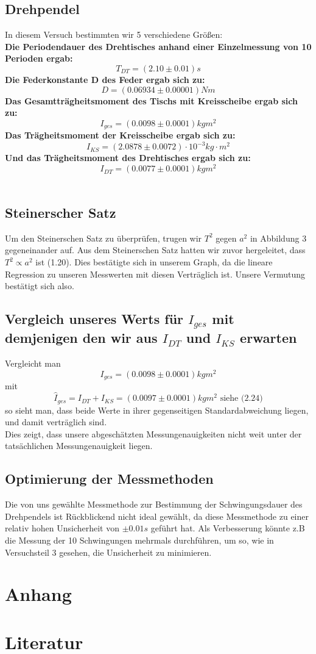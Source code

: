 \documentclass[11pt,a4paper]{article}
\begin{document}
	\subsection{Drehpendel}
	In diesem Versuch bestimmten wir 5 verschiedene Größen:\\
	{\bf Die Periodendauer des Drehtisches anhand einer Einzelmessung von 10 Perioden ergab:}
	$$T_{DT}=(2.10\pm 0.01)s$$
	{\bf Die Federkonstante D des Feder ergab sich zu:}
	$$D=(0.06934 \pm 0.00001) Nm $$
	{\bf Das Gesamtträgheitsmoment des Tischs mit Kreisscheibe ergab sich zu:}
	$$I_{ges}=(0.0098 \pm 0.0001)kgm^2$$
	{\bf Das Trägheitsmoment der Kreisscheibe ergab sich zu:}
	$$	I_{KS}=(2.0878 \pm 0.0072)\cdot 10^{-3} kg \cdot m^2$$
	{\bf Und das Trägheitsmoment des Drehtisches ergab sich zu:}
	$$	I_{DT}=(0.0077 \pm 0.0001)kgm^2 $$
	\\
	\subsection{Steinerscher Satz}
	Um den Steinerschen Satz zu überprüfen, trugen wir $T^2$ gegen $a^2$ in Abbildung 3 gegeneinander auf.
	Aus dem Steinerschen Satz hatten wir zuvor hergeleitet, dass $T^2 \propto a^2$ ist (1.20).
	Dies bestätigte sich in unserem Graph, da die lineare Regression zu unseren Messwerten mit diesen Verträglich ist.
	Unsere Vermutung bestätigt sich also.
	\subsection{Vergleich unseres Werts für $I_{ges}$ mit demjenigen den wir aus $I_{DT}$ und $I_{KS}$ erwarten}
	Vergleicht man $$I_{ges}=(0.0098 \pm 0.0001)kgm^2$$
	mit $$\hat{I}_{ges}=I_{DT}+I_{KS}=(0.0097 \pm 0.0001)kgm^2 \text{ siehe (2.24)}$$
	so sieht man, dass beide Werte in ihrer gegenseitigen Standardabweichung liegen, und damit verträglich sind. \\
	Dies zeigt, dass unsere abgeschätzten Messungenauigkeiten nicht weit unter der tatsächlichen Messungenauigkeit liegen.
	
	\subsection{Optimierung der Messmethoden}
	Die von uns gewählte Messmethode zur Bestimmung der Schwingungsdauer des Drehpendels ist Rückblickend nicht ideal gewählt, da diese Messmethode zu einer relativ hohen Unsicherheit von $\pm 0.01s$ geführt hat.
	Als Verbesserung könnte z.B die Messung der 10 Schwingungen mehrmals durchführen, um so, wie in Versuchsteil 3 gesehen, die Unsicherheit zu minimieren.
	
	
	





\newpage
\section{Anhang}
%

\nocite{*}
\newpage
\section{Literatur}
\newpage
%
\end{document}
